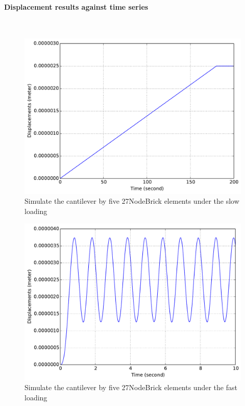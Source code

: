 \paragraph{Displacement results against time series} ~

\begin{figure}[!htb]
  \centering
  \includegraphics[width=12cm]{./Figure-files/_Chapter_Appendix_Illustrative_Examples/brick-5element-slowLoading.pdf}
  \caption{Simulate the cantilever by five 27NodeBrick elements under the slow loading}
  \label{fig_brick5-slow}
\end{figure}


\begin{figure}[!htb]
  \centering
  \includegraphics[width=12cm]{./Figure-files/_Chapter_Appendix_Illustrative_Examples/brick-5element-fastLoading.pdf}
  \caption{Simulate the cantilever by five 27NodeBrick elements under the fast loading}
  \label{fig_brick5-fast}
\end{figure}

